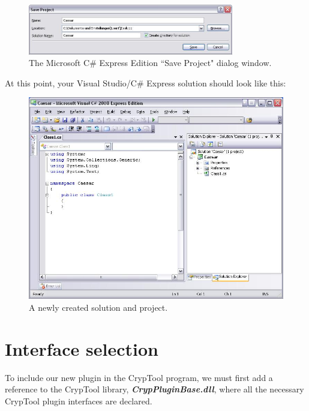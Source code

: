 \begin{figure}[h!]
	\centering
		\includegraphics[width=0.80\textwidth]{figures/save_solution_csharp_express.JPG}
	\caption{The Microsoft C\# Express Edition ``Save Project" dialog window.}
	\label{fig:save_solution_csharp_express}
\end{figure}

\noindent At this point, your Visual Studio\slash C\# Express solution should look like this:

\begin{figure}[h!]
	\centering
		\includegraphics[width=1.00\textwidth]{figures/solution_start_up.jpg}
	\caption{A newly created solution and project.}
	\label{fig:solution_start_up}
\end{figure}
\clearpage

\section{Interface selection}
\label{sec:InterfaceSelection}

To include our new plugin in the CrypTool program, we must first add a reference to the CrypTool library, \textbf{\textit{CrypPluginBase.dll}}, where all the necessary CrypTool plugin interfaces are declared.

